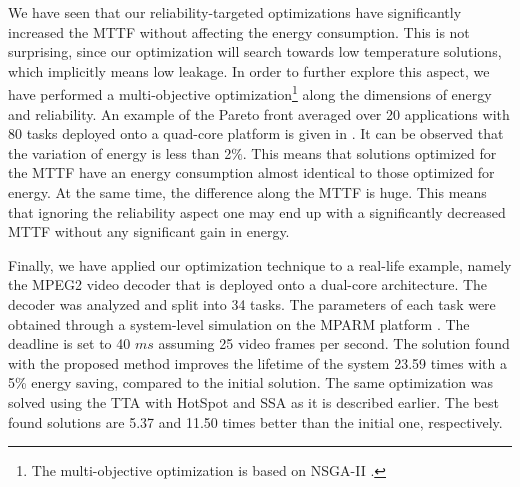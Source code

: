 We have seen that our reliability-targeted optimizations have significantly increased the MTTF without affecting the energy consumption. This is not surprising, since our optimization will search towards low temperature solutions, which implicitly means low leakage. In order to further explore this aspect, we have performed a multi-objective optimization\footnote{The multi-objective optimization is based on NSGA-II \cite{deb2002}.} along the dimensions of energy and reliability. An example of the Pareto front averaged over 20 applications with 80 tasks deployed onto a quad-core platform is given in . It can be observed that the variation of energy is less than 2\%. This means that solutions optimized for the MTTF have an energy consumption almost identical to those optimized for energy. At the same time, the difference along the MTTF is huge. This means that ignoring the reliability aspect one may end up with a significantly decreased MTTF without any significant gain in energy.

Finally, we have applied our optimization technique to a real-life example, namely the MPEG2 video decoder \cite{ffmpeg2011} that is deployed onto a dual-core architecture. The decoder was analyzed and split into 34 tasks. The parameters of each task were obtained through a system-level simulation on the MPARM platform \cite{benini2005}. The deadline is set to 40 $ms$ assuming 25 video frames per second. The solution found with the proposed method improves the lifetime of the system 23.59 times with a 5\% energy saving, compared to the initial solution. The same optimization was solved using the TTA with HotSpot and SSA as it is described earlier. The best found solutions are 5.37 and 11.50 times better than the initial one, respectively.
